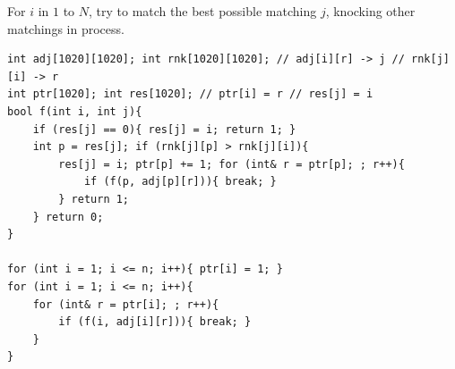 For $i$ in $1$ to $N$, try to match the best possible matching $j$, knocking other matchings in process.

\begin{verbatim}
int adj[1020][1020]; int rnk[1020][1020]; // adj[i][r] -> j // rnk[j][i] -> r
int ptr[1020]; int res[1020]; // ptr[i] = r // res[j] = i
bool f(int i, int j){
	if (res[j] == 0){ res[j] = i; return 1; }
	int p = res[j]; if (rnk[j][p] > rnk[j][i]){
		res[j] = i; ptr[p] += 1; for (int& r = ptr[p]; ; r++){
			if (f(p, adj[p][r])){ break; }
		} return 1;
	} return 0;
}

for (int i = 1; i <= n; i++){ ptr[i] = 1; }
for (int i = 1; i <= n; i++){
	for (int& r = ptr[i]; ; r++){
		if (f(i, adj[i][r])){ break; }
	}
}
\end{verbatim}